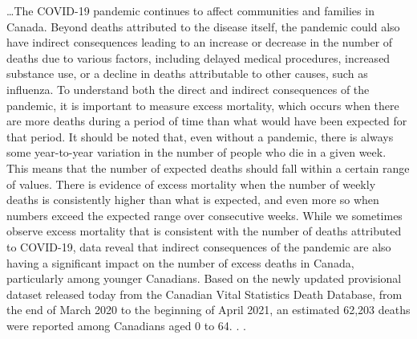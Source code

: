 \begin{refsection}
\begin{tcolorbox}[quote]
\dots{}The COVID-19 pandemic continues to affect communities and families in Canada. Beyond deaths attributed to the disease itself, the pandemic could also have indirect consequences leading to an increase or decrease in the number of deaths due to various factors, including delayed medical procedures, increased substance use, or a decline in deaths attributable to other causes, such as influenza. To understand both the direct and indirect consequences of the pandemic, it is important to measure excess mortality, which occurs when there are more deaths during a period of time than what would have been expected for that period. It should be noted that, even without a pandemic, there is always some year-to-year variation in the number of people who die in a given week. This means that the number of expected deaths should fall within a certain range of values. There is evidence of excess mortality when the number of weekly deaths is consistently higher than what is expected, and even more so when numbers exceed the expected range over consecutive weeks. While we sometimes observe excess mortality that is consistent with the number of deaths attributed to COVID-19, data reveal that indirect consequences of the pandemic are also having a significant impact on the number of excess deaths in Canada, particularly among younger Canadians. Based on the newly updated provisional dataset released today from the Canadian Vital Statistics Death Database, from the end of March 2020 to the beginning of April 2021, an estimated 62,203 deaths were reported among Canadians aged 0 to 64. . .\textsuperscript{\cite{urlas0du2bd}}

\end{tcolorbox}

\printbibliography[heading=subbibliography]

\end{refsection}